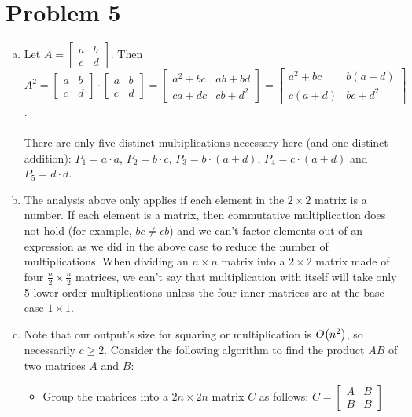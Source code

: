 \documentclass[11pt]{article}
\newcounter{problemnumber}
\let\origleft\left
\let\origright\right
\renewcommand{\left}{\mathopen{}\mathclose\bgroup\origleft}
\renewcommand{\right}{\aftergroup\egroup\origright}
\newcommand{\p}[1]{\left(#1\right)}
\newcommand{\BigOh}[1]{O\p{#1}}
\begin{document}
\section*{Problem 5}
\begin{enumerate}[(a)]
\item Let $A = \begin{bmatrix} a & b \\ c & d \end{bmatrix}$. Then $A^2 = \begin{bmatrix} a&b\\c&d \end{bmatrix} \cdot \begin{bmatrix} a&b\\c&d \end{bmatrix} = \begin{bmatrix} a^2+bc & ab+bd \\ ca+dc & cb+d^2 \end{bmatrix} = \begin{bmatrix} a^2+bc & b(a+d) \\ c(a+d) & bc+d^2 \end{bmatrix}$. \\\\
There are only five distinct multiplications necessary here (and one distinct addition): $P_1 = a\cdot a$, $P_2 = b\cdot c$, $P_3 = b\cdot (a+d)$, $P_4 = c\cdot (a+d)$ and $P_5 = d\cdot d$.
\item The analysis above only applies if each element in the $2\times2$ matrix is a number. If each element is a matrix, then commutative multiplication does not hold (for example, $bc \neq cb$) and we can't factor elements out of an expression as we did in the above case to reduce the number of multiplications. When dividing an $n\times n$ matrix into a $2\times2$ matrix made of four $\frac n2 \times \frac n2$ matrices, we can't say that multiplication with itself will take only 5 lower-order multiplications unless the four inner matrices are at the base case $1\times1$.
\item Note that our output's size for squaring or multiplication is $\BigOh{n^2}$, so necessarily $c\geq 2$. Consider the following algorithm to find the product $AB$ of two matrices $A$ and $B$:
\begin{itemize}
\item Group the matrices into a $2n\times 2n$ matrix $C$ as follows: $C = \begin{bmatrix} A & B \\ B & B \end{bmatrix}$

\end{itemize}
\end{enumerate}
\end{document}
